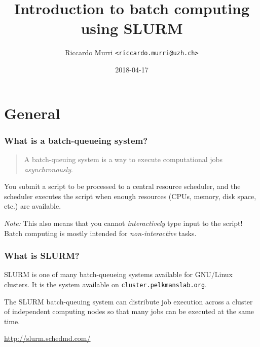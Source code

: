 \documentclass[english,serif,mathserif,usenames,dvipsnames]{beamer}
\begin{document}
\title[Intro to SLURM]{Introduction to batch computing using SLURM}
\author{Riccardo Murri \texttt{<riccardo.murri@uzh.ch>}}
\date{2018-04-17}

\maketitle

\section{General}
\begin{frame}
  \frametitle{What is a batch-queueing system?}

  \begin{quote}
    A batch-queuing system is a way to execute computational jobs
    \emph{asynchronously}.
  \end{quote}

  \pause \+
  You submit a script to be processed to a central
  resource scheduler, and the scheduler executes the script when
  enough resources (CPUs, memory, disk space, etc.) are available.

  \pause \+
  \emph{Note:} This also means that you cannot
  \emph{interactively} type input to the script! Batch computing is
  mostly intended for \emph{non-interactive} tasks.
\end{frame}

\begin{frame}
  \frametitle{What is SLURM?}

  SLURM is one of many batch-queueing systems available for GNU/Linux
  clusters.  It is the system available on \texttt{cluster.pelkmanslab.org}.

  \+
  The SLURM batch-queuing system can distribute job execution across
  a cluster of independent computing nodes so that many jobs can be
  executed at the same time.

  \+
  \begin{references}
    \url{http://slurm.schedmd.com/}
  \end{references}
\end{frame}
\end{document}
